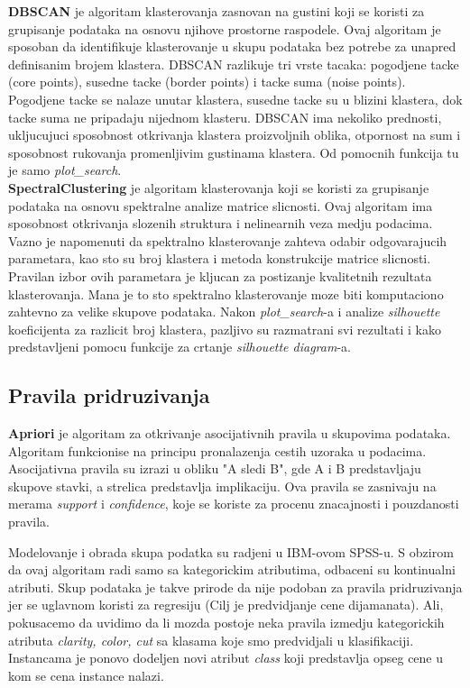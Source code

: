 \documentclass[10pt]{article}
\begin{document}
\textbf{DBSCAN} je algoritam klasterovanja zasnovan na gustini koji se koristi za grupisanje podataka na osnovu njihove prostorne raspodele. Ovaj algoritam je sposoban da identifikuje klasterovanje u skupu podataka bez potrebe za unapred definisanim brojem klastera. DBSCAN razlikuje tri vrste tacaka: pogodjene tacke (core points), susedne tacke (border points) i tacke suma (noise points). Pogodjene tacke se nalaze unutar klastera, susedne tacke su u blizini klastera, dok tacke suma ne pripadaju nijednom klasteru. DBSCAN ima nekoliko prednosti, ukljucujuci sposobnost otkrivanja klastera proizvoljnih oblika, otpornost na sum i sposobnost rukovanja promenljivim gustinama klastera. Od pomocnih funkcija tu je samo \textit{plot\_search}.\\

\textbf{SpectralClustering} je algoritam klasterovanja koji se koristi za grupisanje podataka na osnovu spektralne analize matrice slicnosti. Ovaj algoritam ima sposobnost otkrivanja slozenih struktura i nelinearnih veza medju podacima. Vazno je napomenuti da spektralno klasterovanje zahteva odabir odgovarajucih parametara, kao sto su broj klastera i metoda konstrukcije matrice slicnosti. Pravilan izbor ovih parametara je kljucan za postizanje kvalitetnih rezultata klasterovanja. Mana je to sto spektralno klasterovanje moze biti komputaciono zahtevno za velike skupove podataka. Nakon \textit{plot\_search}-a i analize \textit{silhouette} koeficijenta za razlicit broj klastera, pazljivo su razmatrani svi rezultati i kako predstavljeni pomocu funkcije za crtanje \textit{silhouette diagram}-a.\\

\subsection{Pravila pridruzivanja}
\textbf{Apriori} je algoritam za otkrivanje asocijativnih pravila u skupovima podataka. Algoritam funkcionise na principu pronalazenja cestih uzoraka u podacima. Asocijativna pravila su izrazi u obliku "A sledi B", gde A i B predstavljaju skupove stavki, a strelica predstavlja implikaciju. Ova pravila se zasnivaju na merama \textit{support} i \textit{confidence}, koje se koriste za procenu znacajnosti i pouzdanosti pravila.

Modelovanje i obrada skupa podatka su radjeni u IBM-ovom SPSS-u. S obzirom da ovaj algoritam radi samo sa kategorickim atributima, odbaceni su kontinualni atributi. Skup podataka je takve prirode da nije podoban za pravila pridruzivanja jer se uglavnom koristi za regresiju (Cilj je predvidjanje cene dijamanata). Ali, pokusacemo da uvidimo da li mozda postoje neka pravila izmedju kategorickih atributa \textit{clarity, color, cut} sa klasama koje smo predvidjali u klasifikaciji. Instancama je ponovo dodeljen novi atribut \textit{class} koji predstavlja opseg cene u kom se cena instance nalazi.
\end{document}
